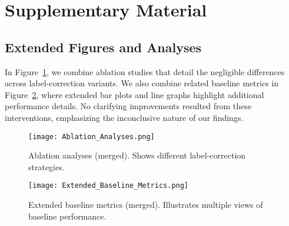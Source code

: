\documentclass{article}
\begin{document}
\appendix
\section{Supplementary Material}
\subsection{Extended Figures and Analyses}
In Figure~\ref{fig:ablations-merged}, we combine ablation studies that detail the negligible differences across label-correction variants. We also combine related baseline metrics in Figure~\ref{fig:baseline-merged}, where extended bar plots and line graphs highlight additional performance details. No clarifying improvements resulted from these interventions, emphasizing the inconclusive nature of our findings.

\begin{figure}[h]
\centering
\texttt{[image: Ablation\_Analyses.png]}
\caption{Ablation analyses (merged). Shows different label-correction strategies.}
\label{fig:ablations-merged}
\end{figure}

\begin{figure}[h]
\centering
\texttt{[image: Extended\_Baseline\_Metrics.png]}
\caption{Extended baseline metrics (merged). Illustrates multiple views of baseline performance.}
\label{fig:baseline-merged}
\end{figure}



\end{document}
